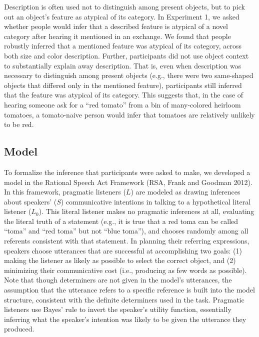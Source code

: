 \documentclass{ucetd}
\begin{document}
Description is often used not to distinguish among present objects, but
to pick out an object's feature as atypical of its category. In
Experiment 1, we asked whether people would infer that a described
feature is atypical of a novel category after hearing it mentioned in an
exchange. We found that people robustly inferred that a mentioned
feature was atypical of its category, across both size and color
description. Further, participants did not use object context to
substantially explain away description. That is, even when description
was necessary to distinguish among present objects (e.g., there were two
same-shaped objects that differed only in the mentioned feature),
participants still inferred that the feature was atypical of its
category. This suggests that, in the case of hearing someone ask for a
``red tomato'' from a bin of many-colored heirloom tomatoes, a
tomato-naive person would infer that tomatoes are relatively unlikely to
be red.

\hypertarget{model}{%
\subsection{Model}\label{model}}

To formalize the inference that participants were asked to make, we
developed a model in the Rational Speech Act Framework (RSA, Frank and
Goodman 2012). In this framework, pragmatic listeners (\(L\)) are
modeled as drawing inferences about speakers' (\(S\)) communicative
intentions in talking to a hypothetical literal listener (\(L_{0}\)).
This literal listener makes no pragmatic inferences at all, evaluating
the literal truth of a statement (e.g., it is true that a red toma can
be called ``toma'' and ``red toma'' but not ``blue toma''), and chooses
randomly among all referents consistent with that statement. In planning
their referring expressions, speakers choose utterances that are
successful at accomplishing two goals: (1) making the listener as likely
as possible to select the correct object, and (2) minimizing their
communicative cost (i.e., producing as few words as possible). Note that
though determiners are not given in the model's utterances, the
assumption that the utterance refers to a specific reference is built
into the model structure, consistent with the definite determiners used
in the task. Pragmatic listeners use Bayes' rule to invert the speaker's
utility function, essentially inferring what the speaker's intention was
likely to be given the utterance they produced.
\end{document}
